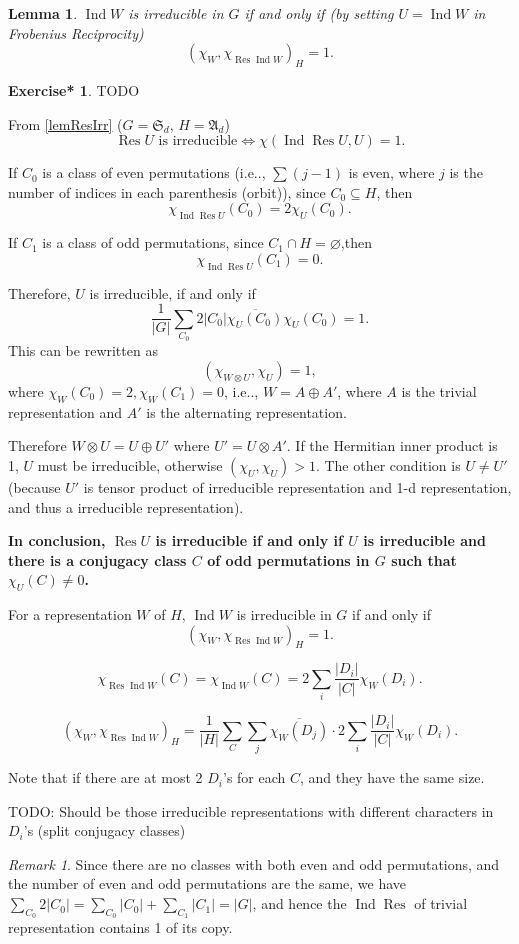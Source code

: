 \documentclass[12pt, letterpaper]{article}
\makeatletter
\newcommand{\Res}{\operatorname{Res}}
\newcommand{\Ind}{\operatorname{Ind}}
\newcommand\ie{i.e\@ifnextchar.{}{.\@}}
\newcommand{\red}[1]{{\color{red} #1}}
\newcommand{\card}[1]{\left\lvert #1 \right\rvert}
\newcommand{\conj}{\overline}
\renewcommand{\emptyset}{\varnothing}
\newtheorem{lem}[prop]{Lemma}
\theoremstyle{definition}
\theoremstyle{remark}
\newtheorem*{rem*}{Remark}
\theoremstyle{definition}
\newtheorem{exe*}[exe]{Exercise*}
\theoremstyle{plain}
\numberwithin{equation}{section}
\makeatother
\begin{document}
	\begin{lem}
		$\Ind W$ is irreducible in $G$ if and only if (by setting $U=\Ind W$ in Frobenius Reciprocity)
		\[(\chi_W,\chi_{\Res\Ind W})_H=1.\]
	\end{lem}
	\begin{exe*}
		\red{TODO}
		
		From \autoref{lemResIrr}
		($G=\mathfrak{S}_d$,
		$H=\mathfrak{A}_d$)
		\[\Res U \text{ is irreducible}
		\iff
		 \chi(\Ind \Res U,U)=1.\]
		 
		If $C_0$ is a class of
		even permutations (\ie, $\sum (j-1)$
		is even, where $j$ is the number of indices in each parenthesis (orbit)),
		since $C_0\subseteq H$, then
		\[\chi_{\Ind \Res U}(C_0)=2\chi_U(C_0).\]
		
		If $C_1$ is a class of odd permutations, since $C_1\cap H=\emptyset$,then
		\[ \chi_{\Ind \Res U}(C_1)=0.\]
		
		Therefore,
		$U$ is irreducible, if and only if
		\[ \frac{1}{\card{G}}\sum_{C_0}2\card{C_0}\conj{\chi_U(C_0)}\chi_U(C_0)=1.\]
		This can be rewritten as
		\[(\chi_{W\otimes U},\chi_U)=1,\]
		where $\chi_W(C_0)=2,\chi_W(C_1)=0$, \ie, $W=A\oplus A'$,
		where $A$ is the trivial representation and $A'$ is the alternating representation.
		
		Therefore $W\otimes U=U\oplus U'$ where $U'=U\otimes A'$.
		If the Hermitian inner product is 1, $U$ must be irreducible,
		otherwise $(\chi_U,\chi_U)>1$. The other condition is $U\ne U'$
		(because $U'$ is tensor product of irreducible representation and 1-d representation,
		and thus a irreducible representation).
		
		\textbf{In conclusion, $\Res U$ is irreducible if and only if $U$ is irreducible
		and there is a conjugacy class $C$ of odd permutations in $G$ such that
		$\chi_U(C)\ne0$.}
	
		For a representation $W$ of $H$,
		$\Ind W$ is irreducible in $G$ if and only if
		\[(\chi_W,\chi_{\Res\Ind W})_H=1.\]
		
		\[\chi_{\Res\Ind W}(C)=\chi_{\Ind W}(C)=2\sum_i \frac{\card{D_i}}{\card{C}}\chi_W(D_i).
		\]
		
		\[(\chi_W,\chi_{\Res\Ind W})_H=\frac{1}{\card{H}}\sum_C \sum_j \conj{\chi_W(D_j)}\cdot 2\sum_i \frac{\card{D_i}}{\card{C}}\chi_W(D_i).
		\]
		
		Note that if there are at most 2 $D_i$'s for each $C$,
		and they have the same size.

		\red{TODO: Should be those irreducible representations with different characters in $D_i$'s (split conjugacy classes)}
	\end{exe*}
	\begin{rem*}
		Since there are no classes with both even and odd permutations,
		and the number of even and odd permutations are the same,
		we have $\sum_{C_0}2\card{C_0}=\sum_{C_0}\card{C_0}+\sum_{C_1}\card{C_1}=\card{G}$, and hence
		the $\Ind \Res$ of trivial representation contains 1 of its copy.
	\end{rem*}
\end{document}
